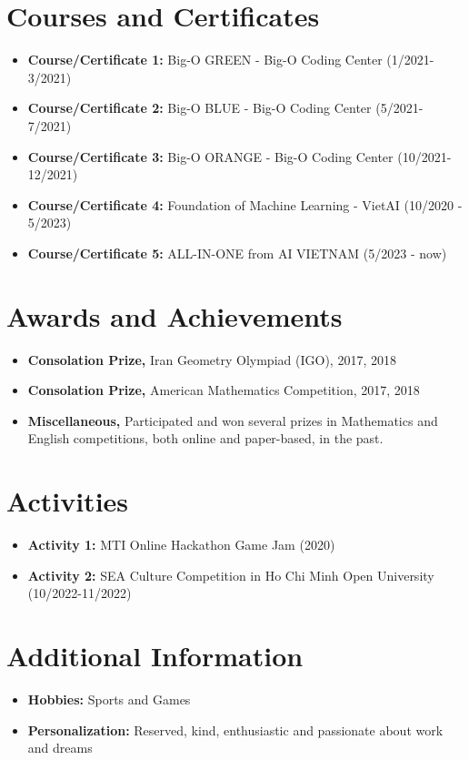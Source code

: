 \documentclass[a4paper,10pt]{article}
\begin{document}
\section*{Courses and Certificates}

\begin{itemize}
    \item \textbf{Course/Certificate 1:} Big-O GREEN - Big-O Coding Center (1/2021-3/2021)
    \item \textbf{Course/Certificate 2:} Big-O BLUE - Big-O Coding Center (5/2021-7/2021)
    \item \textbf{Course/Certificate 3:} Big-O ORANGE - Big-O Coding Center (10/2021-12/2021)
    \item \textbf{Course/Certificate 4:} Foundation of Machine Learning - VietAI
    (10/2020 - 5/2023)
    \item \textbf{Course/Certificate 5:} ALL-IN-ONE from AI VIETNAM (5/2023 - now)
    
\end{itemize}

\section*{Awards and Achievements}

\begin{itemize}
    \item \textbf{Consolation Prize,} Iran Geometry Olympiad (IGO), 2017, 2018
    \item \textbf{Consolation Prize,} American Mathematics Competition, 2017, 2018
    \item \textbf{Miscellaneous,} Participated and won several prizes in Mathematics and English competitions, both online and paper-based, in the past.
\end{itemize}

\section*{Activities}

\begin{itemize}
    \item \textbf{Activity 1:} MTI Online Hackathon Game Jam (2020)
    \item \textbf{Activity 2:} SEA Culture Competition in Ho Chi Minh Open University (10/2022-11/2022)
\end{itemize}

\section*{Additional Information}

\begin{itemize}
    \item \textbf{Hobbies:} Sports and Games
    \item \textbf{Personalization:} Reserved, kind, enthusiastic and passionate about work and dreams
\end{itemize}
\end{document}
